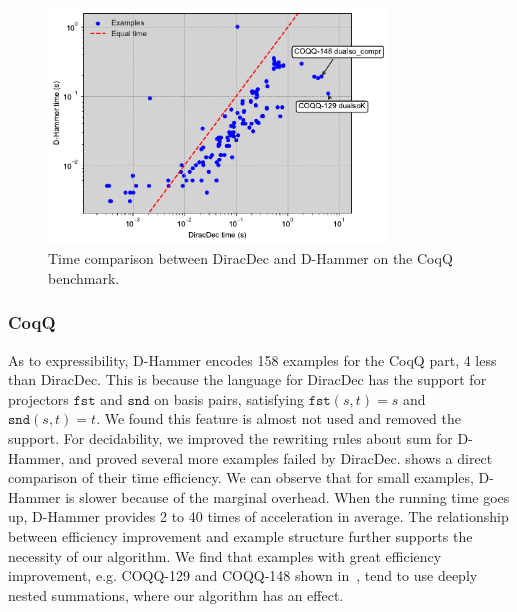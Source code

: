 \begin{figure}[h]
    \centering
    \includegraphics[width=0.8\textwidth]{fig/coqq.pdf}
    \caption{Time comparison between DiracDec and D-Hammer on the CoqQ benchmark.}
    \label{fig: CoqQ plot}
\end{figure}

\subsubsection{CoqQ}
As to expressibility, D-Hammer encodes 158 examples for the CoqQ part, 4 less than DiracDec. This is because the language for DiracDec has the support for projectors $\texttt{fst}$ and $\texttt{snd}$ on basis pairs, satisfying $\texttt{fst} (s, t) = s$ and $\texttt{snd} (s, t) = t$. We found this feature is almost not used and removed the support. For decidability, we improved the rewriting rules about sum for D-Hammer, and proved several more examples failed by DiracDec. 
 shows a direct comparison of their time efficiency.
We can observe that for small examples, D-Hammer is slower because of the marginal overhead. 
When the running time goes up, D-Hammer provides 2 to 40 times of acceleration in average.
The relationship between efficiency improvement and example structure further supports the necessity of our algorithm. 
We find that examples with great efficiency improvement, e.g. COQQ-129 and COQQ-148 shown in~, tend to use deeply nested summations, where our algorithm has an effect.



